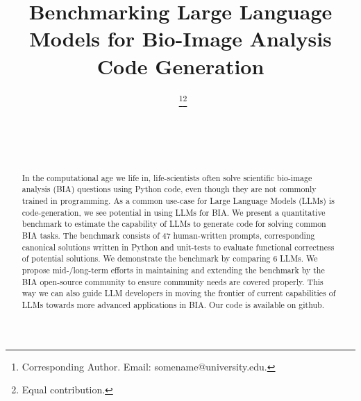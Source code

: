 \documentclass[doubleblind]{ecai}
\begin{document}

\begin{frontmatter}




\title{Benchmarking Large Language Models for Bio-Image Analysis Code Generation}


\author[A]{~\thanks{Corresponding Author. Email: somename@university.edu.}\footnote{Equal contribution.}}
\author[B]{~\footnotemark}
\author[B,C]{~} 

\address[A]{Short Affiliation of First Author}
\address[B]{Short Affiliation of Second Author and Third Author}
\address[C]{Short Alternate Affiliation of Third Author}


\begin{abstract}
In the computational age we life in, life-scientists often solve scientific bio-image analysis (BIA) questions using Python code, even though they are not commonly trained in programming. As a common use-case for Large Language Models (LLMs) is code-generation, we see potential in using LLMs for BIA. We present a quantitative benchmark to estimate the capability of LLMs to generate code for solving common BIA tasks. The benchmark consists of 47 human-written prompts, corresponding canonical solutions written in Python and unit-tests to evaluate functional correctness of potential solutions. We demonstrate the benchmark by comparing 6 LLMs. We propose mid-/long-term efforts in maintaining and extending the benchmark by the BIA open-source community to ensure community needs are covered properly. This way we can also guide LLM developers in moving the frontier of current capabilities of LLMs towards more advanced applications in BIA. Our code is available on github.
\end{abstract}

\end{frontmatter}
\end{document}
